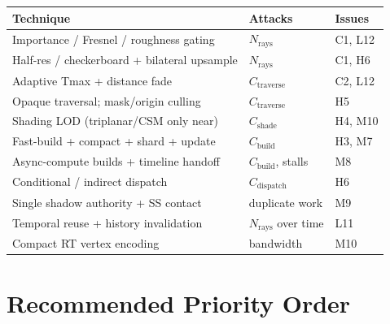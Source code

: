 \documentclass[11pt,a4paper]{article}
\begin{document}
\begin{longtable}{@{}lll@{}}
\toprule
\textbf{Technique} & \textbf{Attacks} & \textbf{Issues} \\
\midrule
Importance / Fresnel / roughness gating & $N_{\mathrm{rays}}$ & C1, L12 \\
Half-res / checkerboard + bilateral upsample & $N_{\mathrm{rays}}$ & C1, H6 \\
Adaptive Tmax + distance fade & $C_{\mathrm{traverse}}$ & C2, L12 \\
Opaque traversal; mask/origin culling & $C_{\mathrm{traverse}}$ & H5 \\
Shading LOD (triplanar/CSM only near) & $C_{\mathrm{shade}}$ & H4, M10 \\
Fast-build + compact + shard + update & $C_{\mathrm{build}}$ & H3, M7 \\
Async-compute builds + timeline handoff & $C_{\mathrm{build}}$, stalls & M8 \\
Conditional / indirect dispatch & $C_{\mathrm{dispatch}}$ & H6 \\
Single shadow authority + SS contact & duplicate work & M9 \\
Temporal reuse + history invalidation & $N_{\mathrm{rays}}$ over time & L11 \\
Compact RT vertex encoding & bandwidth & M10 \\
\bottomrule
\end{longtable}

\section{Recommended Priority Order}
\end{document}
